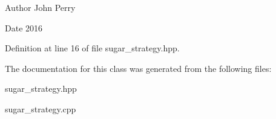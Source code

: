 \begin{DoxyAuthor}{Author}
John Perry 
\end{DoxyAuthor}
\begin{DoxyDate}{Date}
2016 
\end{DoxyDate}


Definition at line 16 of file sugar\+\_\+strategy.\+hpp.



The documentation for this class was generated from the following files\+:\begin{DoxyCompactItemize}
\item 
sugar\+\_\+strategy.\+hpp\item 
sugar\+\_\+strategy.\+cpp\end{DoxyCompactItemize}

